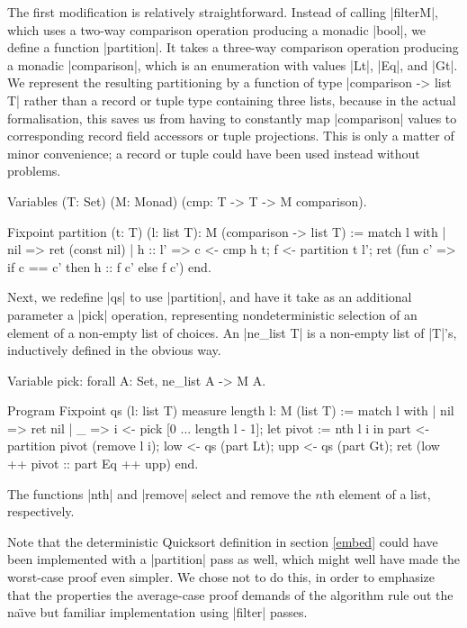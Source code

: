 \documentclass[runningheads]{llncs}
\begin{document}
The first modification is relatively straightforward. Instead of calling
|filterM|, which uses a two-way comparison operation producing a monadic |bool|, we
define a function |partition|. It takes a three-way comparison operation producing a monadic |comparison|, which is an enumeration with values |Lt|, |Eq|, and |Gt|. We represent the resulting partitioning by a function of type |comparison -> list T| rather than a record or tuple type containing three lists, because in the actual formalisation, this saves us from having to constantly map |comparison| values to corresponding record field accessors or tuple projections. This is only a matter of minor convenience; a record or tuple could have been used instead without problems.

\begin{code}
  Variables (T: Set) (M: Monad) (cmp: T -> T -> M comparison).

  Fixpoint partition (t: T) (l: list T): M (comparison -> list T) :=
    match l with
    | nil => ret (const nil)
    | h :: l' =>
        c <- cmp h t; f <- partition t l';
        ret (fun c' => if c == c' then h :: f c' else f c')
    end.
\end{code}

Next, we redefine |qs| to use |partition|, and have it take as an additional parameter a |pick| operation, representing nondeterministic selection of an element of a non-empty list of choices. An |ne_list T| is a non-empty list of |T|'s, inductively defined in the obvious way. 

\begin{code}
  Variable pick: forall A: Set, ne_list A -> M A.

  Program Fixpoint qs (l: list T) {measure length l}: M (list T) :=
    match l with
    | nil => ret nil
    | _ =>
        i <- pick [0 ... length l - 1];
        let pivot := nth l i in
        part <- partition pivot (remove l i);
        low <- qs (part Lt);
        upp <- qs (part Gt);
        ret (low ++ pivot :: part Eq ++ upp)
    end.
\end{code}
The functions |nth| and |remove| select and remove the $n$th element of a list, respectively.

Note that the deterministic Quicksort definition in section \ref{embed} could have been implemented with a |partition| pass as well, which might well have made the worst-case proof even simpler. We chose not to do this, in order to emphasize that the properties the average-case proof demands of the algorithm rule out the na{\"\i}ve but familiar implementation using |filter| passes.
\end{document}
